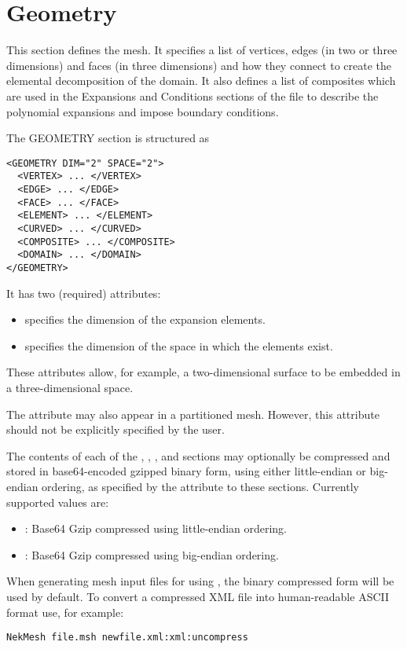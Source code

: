 \section{Geometry}
This section defines the mesh. It specifies a list of vertices, edges (in two or
three dimensions) and faces (in three dimensions) and how they connect to create
the elemental decomposition of the domain. It also defines a list of composites
which are used in the Expansions and Conditions sections of the file to describe
the polynomial expansions and impose boundary conditions.

The GEOMETRY section is structured as
\begin{lstlisting}[style=XMLStyle]
<GEOMETRY DIM="2" SPACE="2">
  <VERTEX> ... </VERTEX>
  <EDGE> ... </EDGE>
  <FACE> ... </FACE>
  <ELEMENT> ... </ELEMENT>
  <CURVED> ... </CURVED>
  <COMPOSITE> ... </COMPOSITE>
  <DOMAIN> ... </DOMAIN>
</GEOMETRY>
\end{lstlisting}
It has two (required) attributes:
\begin{itemize}
    \item {} specifies the dimension of the expansion elements.
    \item {} specifies the dimension of the space in which the
    elements exist.
\end{itemize}
These attributes allow, for example, a two-dimensional surface to be embedded in
a three-dimensional space.

\begin{notebox}
The attribute  may also appear in a partitioned mesh.
However, this attribute should not be explicitly specified by the user.
\end{notebox}

The contents of each of the , , , 
and  sections may optionally be compressed and stored in
base64-encoded gzipped binary form, using either little-endian or big-endian
ordering, as specified by the  attribute to these sections.
Currently supported values are:
\begin{itemize}
    \item {}: Base64 Gzip compressed using little-endian
        ordering.
    \item {}: Base64 Gzip compressed using big-endian
        ordering.
\end{itemize}
When generating mesh input files for \nekpp using , the binary compressed form will be used by default. To convert a compressed XML file into
human-readable ASCII format use, for example:
\begin{lstlisting}[style=BashInputStyle]
NekMesh file.msh newfile.xml:xml:uncompress
\end{lstlisting}

